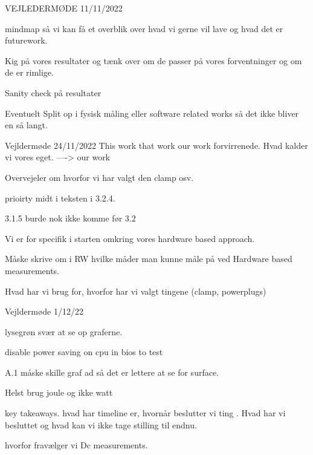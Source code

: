 

VEJLEDERMØDE 11/11/2022

mindmap så vi kan få et overblik over hvad vi gerne vil lave og hvad det er futurework.

Kig på vores resultater og tænk over om de passer på vores forventninger og om de er rimlige. 

Sanity check på resultater

Eventuelt Split op i fysisk måling eller software related works så det ikke bliver en så langt.

Vejldermøde 24/11/2022
This work that work our work forvirrenede. Hvad kalder vi vores eget.
----> our work

Overvejeler om hvorfor vi har valgt den clamp osv.

prioirty midt i teksten i 3.2.4.

3.1.5 burde nok ikke komme før 3.2

Vi er for specifik i starten omkring vores hardware based approach.

Måske skrive om i RW hvilke måder man kunne måle på ved Hardware based measurements.

Hvad har vi brug for, hvorfor har vi valgt tingene (clamp, powerplugs)


Vejldermøde 1/12/22


lysegrøn svær at se op graferne. 

disable power saving on cpu in bios to test

A.1 måske skille graf ad så det er lettere at se for surface. 

Helst brug joule og ikke watt

key takeaways. hvad har timeline er, hvornår beslutter vi ting .
Hvad har vi besluttet og hvad kan vi ikke tage stilling til endnu.



hvorfor fravælger vi Dc measurements.



